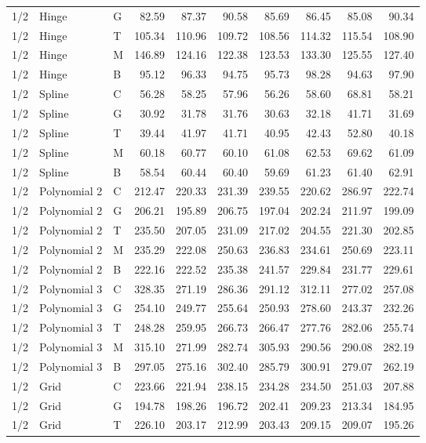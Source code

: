 \begin{longtable}{lllrrrrrrr}
1/2 & Hinge & G & 82.59 & 87.37 & 90.58 & 85.69 & 86.45 & 85.08 & 90.34 \\
1/2 & Hinge & T & 105.34 & 110.96 & 109.72 & 108.56 & 114.32 & 115.54 & 108.90 \\
1/2 & Hinge & M & 146.89 & 124.16 & 122.38 & 123.53 & 133.30 & 125.55 & 127.40 \\
1/2 & Hinge & B & 95.12 & 96.33 & 94.75 & 95.73 & 98.28 & 94.63 & 97.90 \\
1/2 & Spline & C & 56.28 & 58.25 & 57.96 & 56.26 & 58.60 & 68.81 & 58.21 \\
1/2 & Spline & G & 30.92 & 31.78 & 31.76 & 30.63 & 32.18 & 41.71 & 31.69 \\
1/2 & Spline & T & 39.44 & 41.97 & 41.71 & 40.95 & 42.43 & 52.80 & 40.18 \\
1/2 & Spline & M & 60.18 & 60.77 & 60.10 & 61.08 & 62.53 & 69.62 & 61.09 \\
1/2 & Spline & B & 58.54 & 60.44 & 60.40 & 59.69 & 61.23 & 61.40 & 62.91 \\
1/2 & Polynomial 2 & C & 212.47 & 220.33 & 231.39 & 239.55 & 220.62 & 286.97 & 222.74 \\
1/2 & Polynomial 2 & G & 206.21 & 195.89 & 206.75 & 197.04 & 202.24 & 211.97 & 199.09 \\
1/2 & Polynomial 2 & T & 235.50 & 207.05 & 231.09 & 217.02 & 204.55 & 221.30 & 202.85 \\
1/2 & Polynomial 2 & M & 235.29 & 222.08 & 250.63 & 236.83 & 234.61 & 250.69 & 223.11 \\
1/2 & Polynomial 2 & B & 222.16 & 222.52 & 235.38 & 241.57 & 229.84 & 231.77 & 229.61 \\
1/2 & Polynomial 3 & C & 328.35 & 271.19 & 286.36 & 291.12 & 312.11 & 277.02 & 257.08 \\
1/2 & Polynomial 3 & G & 254.10 & 249.77 & 255.64 & 250.93 & 278.60 & 243.37 & 232.26 \\
1/2 & Polynomial 3 & T & 248.28 & 259.95 & 266.73 & 266.47 & 277.76 & 282.06 & 255.74 \\
1/2 & Polynomial 3 & M & 315.10 & 271.99 & 282.74 & 305.93 & 290.56 & 290.08 & 282.19 \\
1/2 & Polynomial 3 & B & 297.05 & 275.16 & 302.40 & 285.79 & 300.91 & 279.07 & 262.19 \\
1/2 & Grid & C & 223.66 & 221.94 & 238.15 & 234.28 & 234.50 & 251.03 & 207.88 \\
1/2 & Grid & G & 194.78 & 198.26 & 196.72 & 202.41 & 209.23 & 213.34 & 184.95 \\
1/2 & Grid & T & 226.10 & 203.17 & 212.99 & 203.43 & 209.15 & 209.07 & 195.26 \\

\end{longtable}
